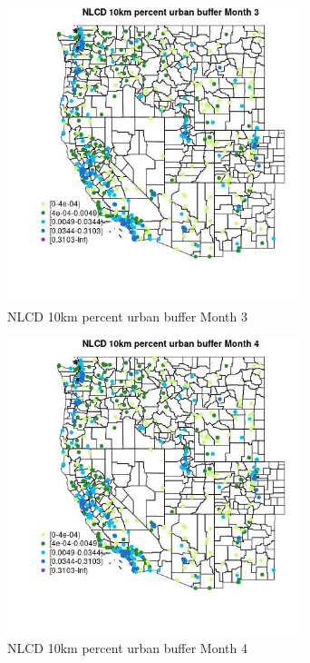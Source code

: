 \begin{figure} 
\centering  
\includegraphics[width=0.77\textwidth]{Code_Outputs/Report_ML_input_PM25_Step4_part_e_de_duplicated_aves_compiled_2019-05-14wNAs_MapObsMo3NLCD_10km_percent_urban_buffer.jpg} 
\caption{\label{fig:Report_ML_input_PM25_Step4_part_e_de_duplicated_aves_compiled_2019-05-14wNAsMapObsMo3NLCD_10km_percent_urban_buffer}NLCD 10km percent urban buffer Month 3} 
\end{figure} 
 

\begin{figure} 
\centering  
\includegraphics[width=0.77\textwidth]{Code_Outputs/Report_ML_input_PM25_Step4_part_e_de_duplicated_aves_compiled_2019-05-14wNAs_MapObsMo4NLCD_10km_percent_urban_buffer.jpg} 
\caption{\label{fig:Report_ML_input_PM25_Step4_part_e_de_duplicated_aves_compiled_2019-05-14wNAsMapObsMo4NLCD_10km_percent_urban_buffer}NLCD 10km percent urban buffer Month 4} 
\end{figure} 
 


